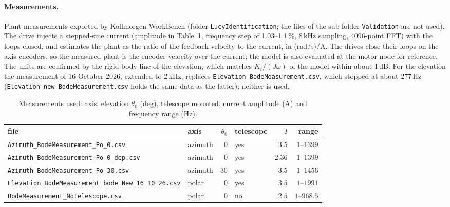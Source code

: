 \documentclass[10pt,a4paper]{article}
\numberwithin{equation}{section}
\begin{document}
\paragraph{Measurements.} Plant measurements exported by Kollmorgen WorkBench (folder \texttt{LucyIdentification}; the files of the sub-folder \texttt{Validation} are not used). The drive injects a stepped-sine current (amplitude in Table~\ref{tab:exp_meas}, frequency step of 1.03--1.1\,\%, 8\,kHz sampling, 4096-point FFT) with the loops closed, and estimates the plant as the ratio of the feedback velocity to the current, in (rad/s)/A. The drives close their loops on the axis encoders, so the measured plant is the encoder velocity over the current; the model is also evaluated at the motor node for reference. The units are confirmed by the rigid-body line of the elevation, which matches $K_t/(J\omega)$ of the model within about 1\,dB. For the elevation the measurement of 16 October 2026, extended to 2\,kHz, replaces \texttt{Elevation\_BodeMeasurement.csv}, which stopped at about 277\,Hz (\texttt{Elevation\_new\_BodeMeasurement.csv} holds the same data as the latter); neither is used.
\begin{table}[H]\centering\small
\caption{Measurements used: axis, elevation $\theta_0$ (deg), telescope mounted, current amplitude (A) and frequency range (Hz).}\label{tab:exp_meas}
\begin{tabular}{llrlrr}\toprule
file & axis & $\theta_0$ & telescope & $I$ & range \\ \midrule
\texttt{Azimuth\_BodeMeasurement\_Po\_0.csv} & azimuth & $0$ & yes & $3.5$ & $1$--$1399$ \\
\texttt{Azimuth\_BodeMeasurement\_Po\_0\_dep.csv} & azimuth & $0$ & yes & $2.36$ & $1$--$1399$ \\
\texttt{Azimuth\_BodeMeasurement\_Po\_30.csv} & azimuth & $30$ & yes & $3.5$ & $1$--$1456$ \\
\texttt{Elevation\_BodeMeasurement\_bode\_New\_16\_10\_26.csv} & polar & $0$ & yes & $3.5$ & $1$--$1991$ \\
\texttt{BodeMeasurement\_NoTelescope.csv} & polar & $0$ & no & $2.5$ & $1$--$968.5$ \\
\bottomrule\end{tabular}\end{table}
\end{document}
